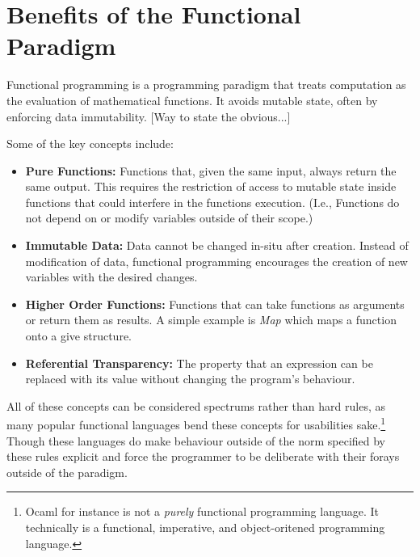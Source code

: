 \documentclass{l4proj}
\begin{document}


\section{Benefits of the Functional Paradigm}

Functional programming is a programming paradigm that treats computation as the evaluation of mathematical functions.
It avoids mutable state, often by enforcing data immutability.
[Way to state the obvious...]

Some of the key concepts include:

\begin{itemize}
    \item \textbf{Pure Functions:} Functions that, given the same input, always return the same output.
    This requires the restriction of access to mutable state inside functions that could interfere in the functions execution.
    (I.e., Functions do not depend on or modify variables outside of their scope.)
    \item \textbf{Immutable Data:} Data cannot be changed in-situ after creation.
    Instead of modification of data, functional programming encourages the creation of new variables with the desired changes.
    \item \textbf{Higher Order Functions:} Functions that can take functions as arguments or return them as results.
    A simple example is \emph{Map} which maps a function onto a give structure.
    \item \textbf{Referential Transparency:} The property that an expression can be replaced with its value without changing the program's behaviour. 
\end{itemize}

All of these concepts can be considered spectrums rather than hard rules, as many popular functional languages bend these concepts for usabilities sake.\footnote{Ocaml for instance is not a \emph{purely} functional programming language. It technically is a functional, imperative, and object-oritened programming language.}
Though these languages do make behaviour outside of the norm specified by these rules explicit and force the programmer to be deliberate with their forays outside of the paradigm.
\end{document}
